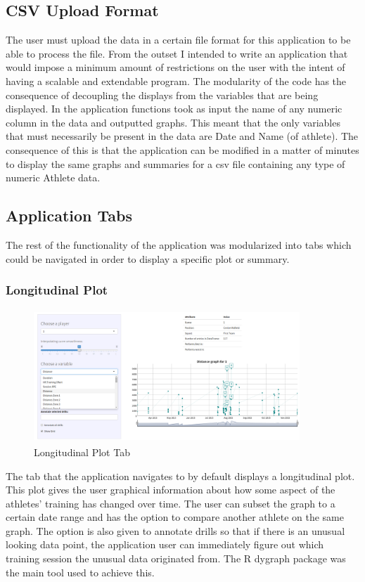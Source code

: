 \subsection{CSV Upload Format}
The user must upload the data in a certain file format for this application to be able to process the file. From the outset I intended to write an application that would impose a minimum amount of restrictions on the user with the intent of having a scalable and extendable program. The modularity of the code has the consequence of decoupling the displays from the variables that are being displayed. In the application functions took as input the name of any numeric column in the data and outputted graphs. This meant that the only variables that must necessarily be present in the data are Date and Name (of athlete). The consequence of this is that the application can be modified in a matter of minutes to display the same graphs and summaries for a csv file containing any type of numeric Athlete data. 

\subsection{Application Tabs}
The rest of the functionality of the application was modularized into tabs which could be navigated in order to display a specific plot or summary.
\newpage
\subsubsection{Longitudinal Plot}
\begin{figure}
	\vspace{-2em}
	\includegraphics[height=5cm, width=10cm]{Images/PlotTab.png}
	\caption{Longitudinal Plot Tab}
\end{figure}
The tab that the application navigates to by default displays a longitudinal plot. This plot gives the user graphical information about how some aspect of the athletes' training has changed over time. The user can subset the graph to a certain date range and has the option to compare another athlete on the same graph. The option is also given to annotate drills so that if there is an unusual looking data point, the application user can immediately figure out which training session the unusual data originated from. The R dygraph package was the main tool used to achieve this. 

